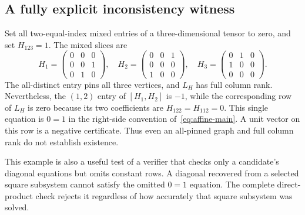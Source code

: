 \subsection{A fully explicit inconsistency witness}
Set all two-equal-index mixed entries of a three-dimensional tensor to zero, and set $H_{123}=1$. The mixed slices are
\[
 H_1=\begin{pmatrix}0&0&0\\0&0&1\\0&1&0\end{pmatrix},\quad
 H_2=\begin{pmatrix}0&0&1\\0&0&0\\1&0&0\end{pmatrix},\quad
 H_3=\begin{pmatrix}0&1&0\\1&0&0\\0&0&0\end{pmatrix}.
\]
The all-distinct entry pins all three vertices, and $L_H$ has full column rank. Nevertheless, the $(1,2)$ entry of $[H_1,H_2]$ is $-1$, while the corresponding row of $L_H$ is zero because its two coefficients are $H_{122}=H_{112}=0$. This single equation is $0=1$ in the right-side convention of~\eqref{eq:affine-main}. A unit vector on this row is a negative certificate. Thus even an all-pinned graph and full column rank do not establish existence.

This example is also a useful test of a verifier that checks only a candidate's diagonal equations but omits constant rows. A diagonal recovered from a selected square subsystem cannot satisfy the omitted $0=1$ equation. The complete direct-product check rejects it regardless of how accurately that square subsystem was solved.


